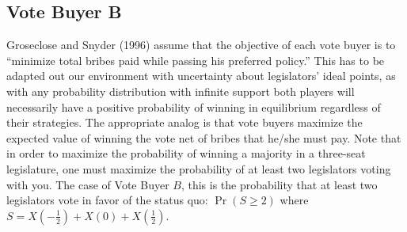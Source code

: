 \documentclass[12pt]{article}
\begin{document}
\subsection{Vote Buyer B}
Groseclose and Snyder (1996) assume that the objective of each vote buyer is to ``minimize total bribes paid while passing his preferred policy.'' This has to be adapted out our environment with uncertainty about legislators' ideal points, as with any probability distribution with infinite support both players will necessarily have a positive probability of winning in equilibrium regardless of their strategies. The appropriate analog is that vote buyers maximize the expected value of winning the vote net of bribes that he/she must pay. Note that in order to maximize the probability of winning a majority in a three-seat legislature, one must maximize the probability of at least two legislators voting with you. The case of Vote Buyer $B$, this is the probability that at least two legislators vote in favor of the status quo: $\Pr(S \geq 2)$ where $S = X\left(-\frac{1}{2}\right) + X\left(0\right) + X\left(\frac{1}{2}\right)$.
\end{document}
